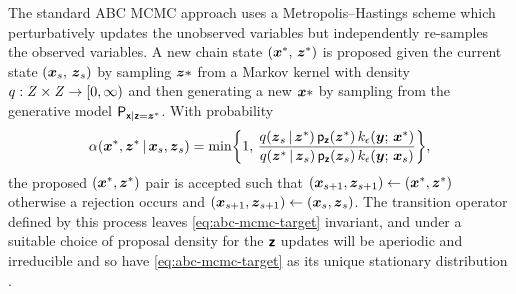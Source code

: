 The standard \ac{ABC} \ac{MCMC} approach uses a Metropolis--Hastings scheme which perturbatively updates the unobserved variables but independently re-samples the observed variables. A new chain state $(\boldsymbol{x}^*,\,\boldsymbol{z}^*)$ is proposed given the current state $(\boldsymbol{x}_s,\,\boldsymbol{z}_s)$ by sampling $\boldsymbol{z}*$ from a Markov kernel with density $q : \mathit{Z} \times \mathit{Z} \to [0, \infty)$ and then generating a new $\boldsymbol{x}*$ by sampling from the generative model $\mathsf{P}_{\boldsymbol{\mathsf{x}}|\boldsymbol{\mathsf{z}}=\boldsymbol{z}^*}$. With probability
\begin{equation}\label{eq:abc-mcmc-accept}
  \alpha(\vct{x}^*,\vct{z}^* \gvn \vct{x}_s,\vct{z}_s) =
  \min\lbr 1,\,
    \frac
    {q(\vct{z}_s\gvn\vct{z}^*)\,\pden{\rvct{z}}(\vct{z}^*)\,k_\epsilon(\vct{y};\,\vct{x}^*)}
    {q(\vct{z}^*\gvn\vct{z}_s)\,\pden{\rvct{z}}(\vct{z}_s)\,k_\epsilon(\vct{y};\,\vct{x}_s)}
  \rbr,
\end{equation}
the proposed $(\boldsymbol{x}^*,\boldsymbol{z}^*)$ pair is accepted such that $(\boldsymbol{x}_{s+1}, \boldsymbol{z}_{s+1}) \gets (\boldsymbol{x}^*,\boldsymbol{z}^*)$ otherwise a rejection occurs and $(\boldsymbol{x}_{s+1}, \boldsymbol{z}_{s+1}) \gets (\boldsymbol{x}_s,\boldsymbol{z}_s)$. The transition operator defined by this process leaves \eqref{eq:abc-mcmc-target} invariant, and under a suitable choice of proposal density for the $\boldsymbol{\mathsf{z}}$ updates will be aperiodic and irreducible and so have \eqref{eq:abc-mcmc-target} as its unique stationary distribution \citep{marjoram2003markov,sisson2011likelihood}. 

